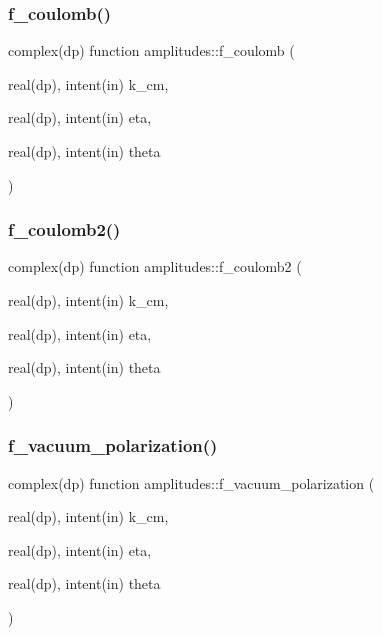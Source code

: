 \subsubsection{\texorpdfstring{f\+\_\+coulomb()}{f\_coulomb()}}
{\footnotesize\ttfamily complex(dp) function amplitudes\+::f\+\_\+coulomb (\begin{DoxyParamCaption}\item[{real(dp), intent(in)}]{k\+\_\+cm,  }\item[{real(dp), intent(in)}]{eta,  }\item[{real(dp), intent(in)}]{theta }\end{DoxyParamCaption})\hspace{0.3cm}{\ttfamily [private]}}

\mbox{\label{namespaceamplitudes_a1deb8553133d2a765c200dddc6d4019e}} 
\subsubsection{\texorpdfstring{f\+\_\+coulomb2()}{f\_coulomb2()}}
{\footnotesize\ttfamily complex(dp) function amplitudes\+::f\+\_\+coulomb2 (\begin{DoxyParamCaption}\item[{real(dp), intent(in)}]{k\+\_\+cm,  }\item[{real(dp), intent(in)}]{eta,  }\item[{real(dp), intent(in)}]{theta }\end{DoxyParamCaption})\hspace{0.3cm}{\ttfamily [private]}}

\mbox{\label{namespaceamplitudes_aeefee706538ec9db13783ca6bf39139c}} 
\subsubsection{\texorpdfstring{f\+\_\+vacuum\+\_\+polarization()}{f\_vacuum\_polarization()}}
{\footnotesize\ttfamily complex(dp) function amplitudes\+::f\+\_\+vacuum\+\_\+polarization (\begin{DoxyParamCaption}\item[{real(dp), intent(in)}]{k\+\_\+cm,  }\item[{real(dp), intent(in)}]{eta,  }\item[{real(dp), intent(in)}]{theta }\end{DoxyParamCaption})\hspace{0.3cm}{\ttfamily [private]}}

